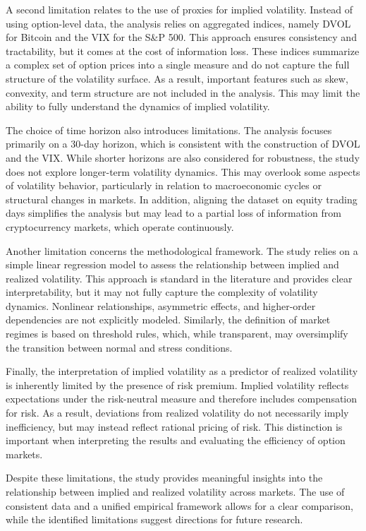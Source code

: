 \documentclass[11pt,a4paper,openany]{report}
\begin{document}
A second limitation relates to the use of proxies for implied
volatility. Instead of using option-level data, the analysis relies on
aggregated indices, namely DVOL for Bitcoin and the VIX for the S\&P
500. This approach ensures consistency and tractability, but it comes at
the cost of information loss. These indices summarize a complex set of
option prices into a single measure and do not capture the full
structure of the volatility surface. As a result, important features
such as skew, convexity, and term structure are not included in the
analysis. This may limit the ability to fully understand the dynamics of
implied volatility.

The choice of time horizon also introduces limitations. The analysis
focuses primarily on a 30-day horizon, which is consistent with the
construction of DVOL and the VIX. While shorter horizons are also
considered for robustness, the study does not explore longer-term
volatility dynamics. This may overlook some aspects of volatility
behavior, particularly in relation to macroeconomic cycles or structural
changes in markets. In addition, aligning the dataset on equity trading
days simplifies the analysis but may lead to a partial loss of
information from cryptocurrency markets, which operate continuously.

Another limitation concerns the methodological framework. The study
relies on a simple linear regression model to assess the relationship
between implied and realized volatility. This approach is standard in
the literature and provides clear interpretability, but it may not fully
capture the complexity of volatility dynamics. Nonlinear relationships,
asymmetric effects, and higher-order dependencies are not explicitly
modeled. Similarly, the definition of market regimes is based on
threshold rules, which, while transparent, may oversimplify the
transition between normal and stress conditions.

Finally, the interpretation of implied volatility as a predictor of
realized volatility is inherently limited by the presence of risk
premium. Implied volatility reflects expectations under the risk-neutral
measure and therefore includes compensation for risk. As a result,
deviations from realized volatility do not necessarily imply
inefficiency, but may instead reflect rational pricing of risk. This
distinction is important when interpreting the results and evaluating
the efficiency of option markets.

Despite these limitations, the study provides meaningful insights into
the relationship between implied and realized volatility across markets.
The use of consistent data and a unified empirical framework allows for
a clear comparison, while the identified limitations suggest directions
for future research.
\end{document}
